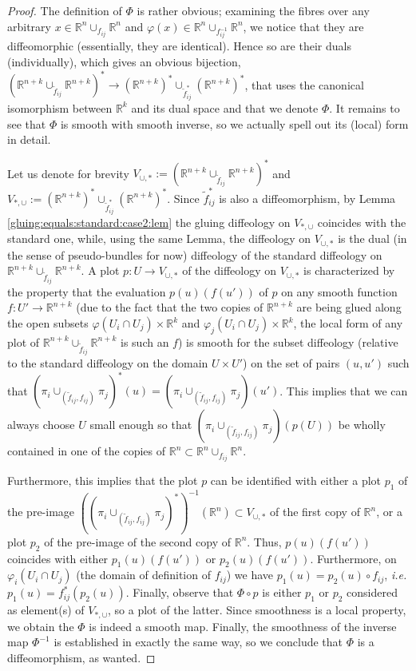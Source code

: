 \documentclass{article}
\newcommand\matR{{\mathbb{R}}}
\begin{document}
\begin{proof}
The definition of $\Phi$ is rather obvious; examining the fibres over any arbitrary $x\in\matR^n\cup_{f_{ij}}\matR^n$ and $\varphi(x)\in\matR^n\cup_{f_{ij}^{-1}}\matR^n$, we notice that they are diffeomorphic 
(essentially, they are identical). Hence so are their duals (individually), which gives an obvious bijection, $(\matR^{n+k}\cup_{\tilde{f}_{ij}}\matR^{n+k})^*\to(\matR^{n+k})^*\cup_{\tilde{f}_{ij}^*}(\matR^{n+k})^*$,
that uses the canonical isomorphism between $\matR^k$ and its dual space and that we denote $\Phi$. It remains to see that $\Phi$ is smooth with smooth inverse, so we actually spell out its (local) form 
in detail.

Let us denote for brevity $V_{\cup,*}:=(\matR^{n+k}\cup_{\tilde{f}_{ij}}\matR^{n+k})^*$ and $V_{*,\cup}:=(\matR^{n+k})^*\cup_{\tilde{f}_{ij}^*}(\matR^{n+k})^*$. Since $\tilde{f}_{ij}^*$ is also a diffeomorphism, 
by Lemma \ref{gluing:equals:standard:case2:lem} the gluing diffeology on $V_{*,\cup}$ coincides with the standard one, while, using the same Lemma, the diffeology on $V_{\cup,*}$ is the dual (in the sense 
of pseudo-bundles for now) diffeology of the standard diffeology on $\matR^{n+k}\cup_{\tilde{f}_{ij}}\matR^{n+k}$. A plot $p:U\to V_{\cup,*}$ of the diffeology on $V_{\cup,*}$ is characterized by the property 
that the evaluation $p(u)(f(u'))$ of $p$ on any smooth function $f:U'\to\matR^{n+k}$ (due to the fact that the two copies of $\matR^{n+k}$ are being glued along the open subsets 
$\varphi(U_i\cap U_j)\times\matR^k$ and $\varphi_j(U_i\cap U_j)\times\matR^k$, the local form of any plot of $\matR^{n+k}\cup_{\tilde{f}_{ij}}\matR^{n+k}$ is such an $f$) is smooth for the subset diffeology 
(relative to the standard diffeology on the domain $U\times U'$) on the set of pairs $(u,u')$ such that $(\pi_i\cup_{(\tilde{f}_{ij},f_{ij})}\pi_j)^*(u)=(\pi_i\cup_{(\tilde{f}_{ij},f_{ij})}\pi_j)(u')$. This implies that we 
can always choose $U$ small enough so that $(\pi_i\cup_{(\tilde{f}_{ij},f_{ij})}\pi_j)(p(U))$ be wholly contained in one of the copies of $\matR^n\subset\matR^n\cup_{f_{ij}}\matR^n$.

Furthermore, this implies that the plot $p$ can be identified with either a plot $p_1$ of the pre-image $((\pi_i\cup_{(\tilde{f}_{ij},f_{ij})}\pi_j)^*)^{-1}(\matR^n)\subset V_{\cup,*}$ of the first copy of $\matR^n$, or a 
plot $p_2$ of the pre-image of the second copy of $\matR^n$. Thus, $p(u)(f(u'))$ coincides with either $p_1(u)(f(u'))$ or $p_2(u)(f(u'))$. Furthermore, on $\varphi_i(U_i\cap U_j)$ (the domain of definition of 
$f_{ij}$) we have $p_1(u)=p_2(u)\circ f_{ij}$, \emph{i.e.} $p_1(u)=f_{ij}^*(p_2(u))$. Finally, observe that $\Phi\circ p$ is either $p_1$ or $p_2$ considered as element(s) of $V_{*,\cup}$, so a plot of the latter. 
Since smoothness is a local property, we obtain the $\Phi$ is indeed a smooth map. Finally, the smoothness of the inverse map $\Phi^{-1}$ is established in exactly the same way, so we conclude that $\Phi$ 
is a diffeomorphism, as wanted.
\end{proof}
\end{document}
